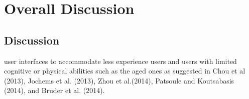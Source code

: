 
\chapter{Overall Discussion} %

\label{discussionchapter} %


\section{Discussion}
 user interfaces to accommodate less experience users and users with limited cognitive or physical abilities such as the aged ones as suggested in Chou et al (2013), Jochems et al. (2013), Zhou et al.(2014), Patsoule and Koutsabasis (2014), and Bruder et al. (2014).


\begin{flushright}
\end{flushright}
